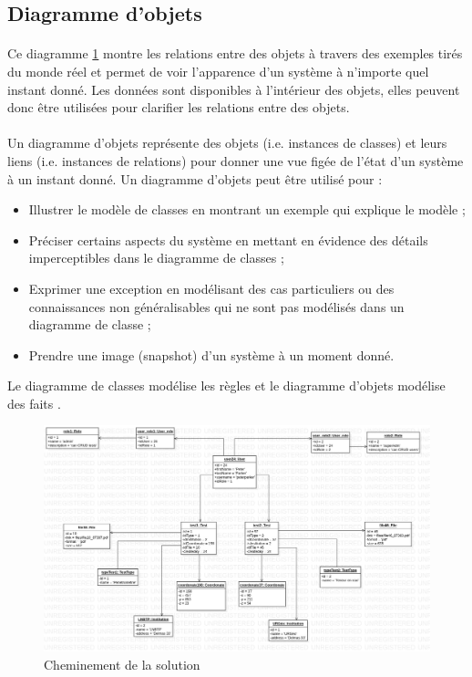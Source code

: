    \subsection{Diagramme d'objets}
    \paragraph{}
    Ce diagramme \ref{fig:ObjectDiagram} montre les relations entre des objets à travers 
    des exemples tirés du monde réel et permet de voir 
    l'apparence d'un système à n'importe quel instant donné. 
    Les données sont disponibles à l'intérieur des objets, 
    elles peuvent donc être utilisées pour clarifier les 
    relations entre des objets.
    \paragraph{}
    Un diagramme d'objets représente des objets (i.e. instances 
    de classes) et leurs liens (i.e. instances de relations) 
    pour donner une vue figée de l'état d'un système à un 
    instant donné. Un diagramme d'objets peut être utilisé pour :
    \begin{itemize}
        \item Illustrer le modèle de classes en montrant un exemple qui explique le modèle ;
        \item Préciser certains aspects du système en mettant en évidence des détails imperceptibles dans le diagramme de classes ;
        \item Exprimer une exception en modélisant des cas particuliers ou des connaissances non généralisables 
        qui ne sont pas modélisés dans un diagramme de classe ;
        \item Prendre une image (snapshot) d'un système à un moment donné.
    \end{itemize}
    Le diagramme de classes modélise les règles et le diagramme d'objets 
    modélise des faits \cite{audibert2009uml}.
    \begin{figure}[t]
        \centering
        \includegraphics[width=1\textwidth]{images/Analyse_des_besoins/ObjectDiagram.jpg}
        \caption{Cheminement de la solution}
        \label{fig:ObjectDiagram}
    \end{figure}

